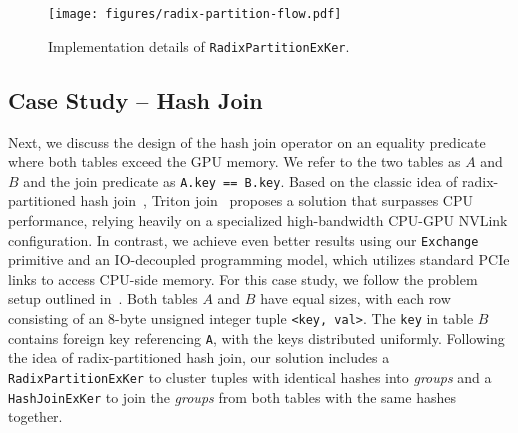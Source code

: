 
\begin{figure}[t]
    \centering
    \texttt{[image: figures/radix-partition-flow.pdf]}
    \caption{Implementation details of \texttt{RadixPartitionExKer}. }
    \label{fig:radix-partition-flow}
\end{figure}

\subsection{Case Study -- Hash Join}
\label{sec:design-join}
Next, we discuss the design of the hash join operator on an equality predicate where both tables exceed the GPU memory.
We refer to the two tables as  \( A \) and \( B \) and the join predicate as \texttt{A.key == B.key}.
Based on the classic idea of radix-partitioned hash join~\cite{partitioned-join-vldb99}, Triton join~\cite{triton-join} proposes a solution that surpasses CPU performance, relying heavily on a specialized high-bandwidth CPU-GPU NVLink configuration. 
In contrast, we achieve even better results using our \texttt{Exchange} primitive and an IO-decoupled programming model, which utilizes standard PCIe links to access CPU-side memory.
For this case study, we follow the problem setup outlined in~\cite{triton-join}. 
Both tables \( A \) and \( B \) have equal sizes, with each row consisting of an 8-byte unsigned integer tuple \texttt{<key, val>}. 
The \texttt{key} in table \( B \) contains foreign key referencing \texttt{A}, with the keys distributed uniformly.
Following the idea of radix-partitioned hash join, our solution includes a \texttt{RadixPartitionExKer} to cluster tuples with identical hashes into \textit{groups} and a \texttt{HashJoinExKer} to join the \textit{groups} from both tables with the same hashes together.

